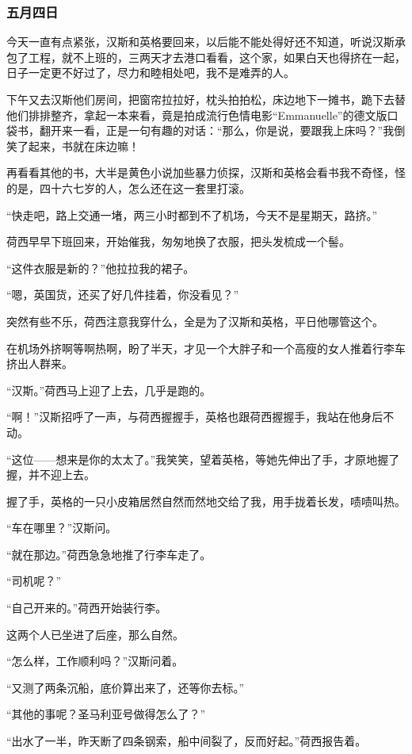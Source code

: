 \subsubsection{五月四日}
\par 今天一直有点紧张，汉斯和英格要回来，以后能不能处得好还不知道，听说汉斯承包了工程，就不上班的，三两天才去港口看看，这个家，如果白天也得挤在一起，日子一定更不好过了，尽力和睦相处吧，我不是难弄的人。
\par 下午又去汉斯他们房间，把窗帘拉拉好，枕头拍拍松，床边地下一摊书，跪下去替他们排排整齐，拿起一本来看，竟是拍成流行色情电影“Emmanuelle”的德文版口袋书，翻开来一看，正是一句有趣的对话：“那么，你是说，要跟我上床吗？”我倒笑了起来，书就在床边嘛！
\par 再看看其他的书，大半是黄色小说加些暴力侦探，汉斯和英格会看书我不奇怪，怪的是，四十六七岁的人，怎么还在这一套里打滚。
\par “快走吧，路上交通一堵，两三小时都到不了机场，今天不是星期天，路挤。”
\par 荷西早早下班回来，开始催我，匆匆地换了衣服，把头发梳成一个髻。
\par “这件衣服是新的？”他拉拉我的裙子。
\par “嗯，英国货，还买了好几件挂着，你没看见？”
\par 突然有些不乐，荷西注意我穿什么，全是为了汉斯和英格，平日他哪管这个。
\par 在机场外挤啊等啊热啊，盼了半天，才见一个大胖子和一个高瘦的女人推着行李车挤出人群来。
\par “汉斯。”荷西马上迎了上去，几乎是跑的。
\par “啊！”汉斯招呼了一声，与荷西握握手，英格也跟荷西握握手，我站在他身后不动。
\par “这位——想来是你的太太了。”我笑笑，望着英格，等她先伸出了手，才原地握了握，并不迎上去。
\par 握了手，英格的一只小皮箱居然自然而然地交给了我，用手拢着长发，啧啧叫热。
\par “车在哪里？”汉斯问。
\par “就在那边。”荷西急急地推了行李车走了。
\par “司机呢？”
\par “自己开来的。”荷西开始装行李。
\par 这两个人已坐进了后座，那么自然。
\par “怎么样，工作顺利吗？”汉斯问着。
\par “又测了两条沉船，底价算出来了，还等你去标。”
\par “其他的事呢？圣马利亚号做得怎么了？”
\par “出水了一半，昨天断了四条钢索，船中间裂了，反而好起。”荷西报告着。
